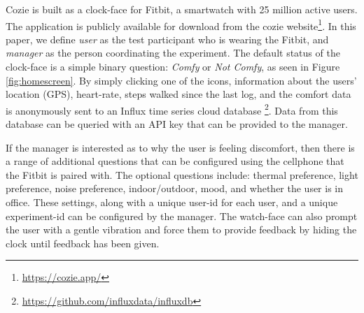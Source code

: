 
Cozie is built as a clock-face for Fitbit, a smartwatch with 25 million active users. The application is publicly available for download from the cozie website\footnote{\url{https://cozie.app/}}. In this paper, we define \emph{user} as the test participant who is wearing the Fitbit, and \emph{manager} as the person coordinating the experiment. The default status of the clock-face is a simple binary question: \emph{Comfy} or \emph{Not Comfy}, as seen in Figure \ref{fig:homescreen}. By simply clicking one of the icons, information about the users' location (GPS), heart-rate, steps walked since the last log, and the comfort data is anonymously sent to an Influx time series cloud database \footnote{\url{https://github.com/influxdata/influxdb}}. Data from this database can be queried with an API key that can be provided to the manager. 

If the manager is interested as to why the user is feeling discomfort, then there is a range of additional questions that can be configured using the cellphone that the Fitbit is paired with. The optional questions include: thermal preference, light preference, noise preference, indoor/outdoor, mood, and whether the user is in office. These settings, along with a unique user-id for each user, and a unique experiment-id can be configured by the manager. The watch-face can also prompt the user with a gentle vibration and force them to provide feedback by hiding the clock until feedback has been given.
